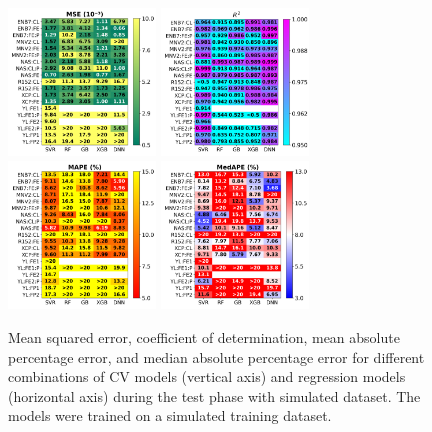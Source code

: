 \documentclass[10pt]{iopart}
\begin{document}
\begin{figure}
\centering
\includegraphics[width=0.35\textwidth]{Fig6a}
\includegraphics[width=0.35\textwidth]{Fig6b}
\includegraphics[width=0.35\textwidth]{Fig6c}
\includegraphics[width=0.35\textwidth]{Fig6d}
\caption{
Mean squared error, coefficient of determination, mean absolute percentage error, and median absolute percentage error
for different combinations of CV models (vertical axis) and regression models (horizontal axis)
during the test phase with simulated dataset.
The models were trained on a simulated training dataset.
}\label{Fig6}
\end{figure}
\end{document}
